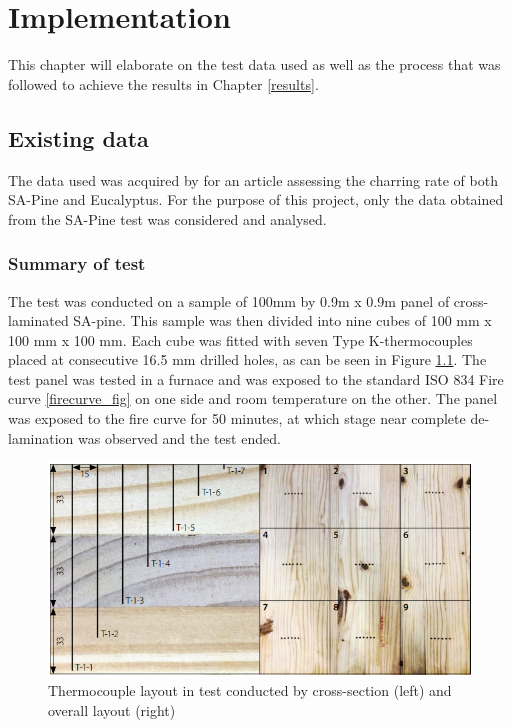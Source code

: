 \chapter{Implementation} \label{implementation}
This chapter will elaborate on the test data used as well as the process that was followed to achieve the results in Chapter \ref{results}.
\section{Existing data}
The data used was acquired by \cite{Westhuyzen:2020} for an article assessing the charring rate of both SA-Pine and Eucalyptus.
	For the purpose of this project, only the data obtained from the SA-Pine test was considered and analysed. 
	\subsection{Summary of test}
	The test was conducted on a sample of 100mm by 0.9m x 0.9m panel of cross-laminated SA-pine.
	This sample was then divided into nine cubes of 100 mm x 100 mm x 100 mm.
	Each cube was fitted with seven Type K-thermocouples placed at consecutive 16.5 mm drilled holes, as can be seen in Figure \ref{TC_layout}. 
	The test panel was tested in a furnace and was exposed to the standard ISO 834 Fire curve \ref{firecurve_fig} on one side and room temperature on the other. 
	The panel was exposed to the fire curve for 50 minutes, at which stage near complete de-lamination was observed and the test ended.
	\begin{figure}[H]
	\centering
	\includegraphics[width=0.75\linewidth]{figures/TC_layout.png}
	\caption{Thermocouple layout in test conducted by \cite{Westhuyzen:2020} cross-section (left) and overall layout (right)}
	\label{TC_layout}
	\end{figure}
	
